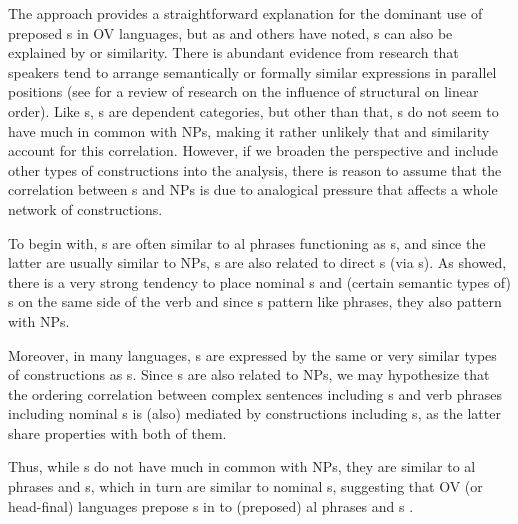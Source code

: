 \documentclass[output=paper]{langsci/langscibook}
\begin{document}
\largerpage
The  approach provides a straightforward explanation for the dominant use of preposed s in OV languages, but as \citet{Krifka1985} and others have noted, s can also be explained by  or similarity. There is abundant evidence from  research that speakers tend to arrange semantically or formally similar expressions in parallel positions (see \citealt{PickeringFerreira2008} for a review of  research on the influence of structural  on linear order). Like s, s are dependent categories, but other than that, s do not seem to have much in common with  NPs, making it rather unlikely that  and similarity account for this correlation. However, if we broaden the perspective and include other types of constructions into the analysis, there is reason to assume that the correlation between s and  NPs is due to analogical pressure that affects a whole network of constructions.


To begin with, s are often similar to al phrases functioning as s, and since the latter are usually similar to  NPs, s are also related to direct s (via s). As \citet{Dryer1992} showed, there is a very strong tendency to place nominal s and (certain semantic types of) s on the same side of the verb and since s pattern like  phrases, they also pattern with  NPs. 

Moreover, in many languages, s are expressed by the same or very similar types of constructions as s. Since s are also related to  NPs, we may hypothesize that the ordering correlation between complex sentences including s and verb phrases including nominal s is (also) mediated by constructions including s, as the latter share properties with both of them.

Thus, while s do not have much in common with  NPs, they are similar to al phrases and s, which in turn are similar to nominal s, suggesting that OV (or head-final) languages prepose s in  to (preposed) al phrases and s .
\end{document}
